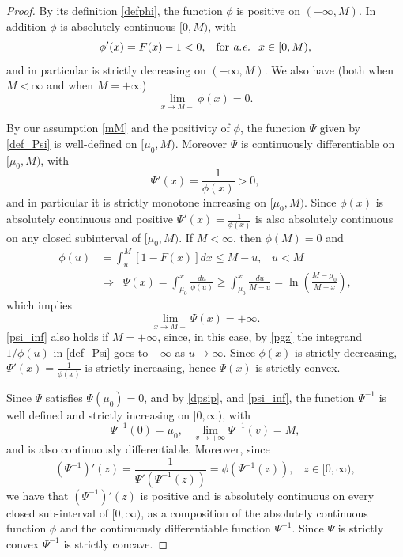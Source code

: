 \documentclass{article}
\numberwithin{equation}{section}
\begin{document}
	\begin{proof}
		By its definition \eqref{defphi}, the function $\phi$ is positive on $(-\infty,M)$. In addition
		$\phi$ is absolutely continuous  $[0,M)$, with
		$$\phi'(x)=F(x)-1<0,\;\;\;{\mbox{for {\it{a.e.}} }}\;x\in [0,M),$$
		and in particular is strictly decreasing on 
		$(-\infty,M)$.
		We also have (both when $M<\infty$ and when $M=+\infty$)
		\begin{equation}\label{pgz}
			\lim_{x\rightarrow M-}\phi(x)=0.
		\end{equation}
		
		By our assumption \eqref{mM} and the positivity of $\phi$, the function
		$\Psi$ given by \eqref{def_Psi} is well-defined on $[\mu_0,M)$.
		Moreover $\Psi$ is continuously differentiable on $[\mu_0,M)$, with
		\begin{equation}\label{dpsip}\Psi'(x)=\frac{1}{\phi(x)}>0,\end{equation}
		and in particular it is strictly monotone
		increasing on $[\mu_0,M)$. Since $\phi(x)$ is absolutely continuous and positive 
		$\Psi'(x)=\frac{1}{\phi(x)}$ is also absolutely continuous on any closed subinterval of $[\mu_0,M)$.
		If $M<\infty$, then $\phi(M)=0$ and
		\begin{align*}\phi(u)&=\int_{u}^M  [1-F(x)]dx\leq M-u,\;\;\; u<M\\
			&\Rightarrow\;\;\Psi(x)=\int_{\mu_0}^x \frac{du}{\phi(u)}\geq \int_{\mu_0}^x
			\frac{du}{M-u}=\ln\left( \frac{M-\mu_0}{M-x}\right),
		\end{align*}
		which implies 
		\begin{equation}\label{psi_inf}\lim_{x\rightarrow M-}\Psi(x)=+\infty.\end{equation}
		\eqref{psi_inf} also holds if $M=+\infty$,  
		since, in this case, by \eqref{pgz} the integrand $1/\phi(u)$ in \eqref{def_Psi} 
		goes to $+\infty$ as $u\rightarrow\infty$.
		Since $\phi(x)$ is strictly decreasing, 
		$\Psi'(x)=\frac{1}{\phi(x)}$ is strictly increasing, hence $\Psi(x)$ is strictly convex.
		
		Since $\Psi$  satisfies $\Psi(\mu_0)=0$, and by \eqref{dpsip}, and \eqref{psi_inf},
		the function 
		$\Psi^{-1}$ is well defined and strictly increasing on $[0,\infty)$, with
		\begin{equation}\label{psip}\Psi^{-1}(0)=\mu_0,\;\;\; \lim_{v\rightarrow +\infty} \Psi^{-1}(v)=M,\end{equation}
		and is also continuously differentiable.
		Moreover, since 
		$$(\Psi^{-1})'(z)=\frac{1}{\Psi'(\Psi^{-1}(z))}=\phi(\Psi^{-1}(z)),\;\;\;z\in [0,\infty),$$
		we have that $(\Psi^{-1})'(z)$ is positive and is absolutely continuous on every closed sub-interval of $[0,\infty)$, as a composition of the absolutely continuous function $\phi$ and the continuously  differentiable function $\Psi^{-1}$.
		Since $\Psi$ is strictly convex 
		$\Psi^{-1}$ is strictly concave.
		

\end{proof}
\end{document}
